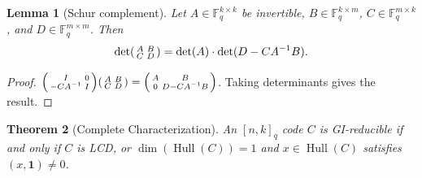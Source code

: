 \documentclass[11pt]{article}
\newcommand{\FF}{\mathbb{F}}
\newcommand{\0}{\mathbf{0}}
\newcommand{\1}{\mathbf{1}}
\DeclareMathOperator{\Hull}{Hull}
\theoremstyle{plain}
\newtheorem{theorem}{Theorem}[section]
\newtheorem{lemma}[theorem]{Lemma}
\theoremstyle{definition}
\theoremstyle{remark}
\begin{document}
\begin{lemma}[Schur complement]
\label{lem:schur_complement}
Let $A \in \FF_q^{k \times k}$ be invertible, $B \in \FF_q^{k \times m}$, $C \in \FF_q^{m \times k}$, and $D \in \FF_q^{m \times m}$. Then
\[
\det \begin{psmallmatrix} A & B \\ C & D \end{psmallmatrix} = \det(A) \cdot \det(D - CA^{-1}B).
\]
\end{lemma}
\begin{proof}
$\begin{psmallmatrix} I & 0 \\ -CA^{-1} & I \end{psmallmatrix} \begin{psmallmatrix} A & B \\ C & D \end{psmallmatrix} = \begin{psmallmatrix} A & B \\ 0 & D - CA^{-1}B \end{psmallmatrix}$. Taking determinants gives the result.
\end{proof}

\begin{theorem}[Complete Characterization]
\label{thm:gi_reducible_count}
An $[n,k]_q$ code $C$ is GI-reducible if and only if $C$ is LCD, or $\dim(\Hull(C)) = 1$ and $x \in \Hull(C)$ satisfies $(x,\1) \neq 0$.
\end{theorem}
\end{document}
